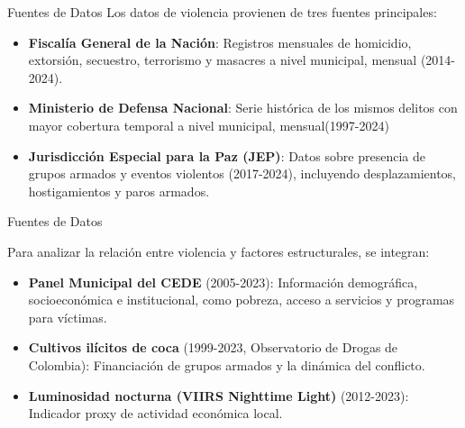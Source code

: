 
\begin{frame}{Fuentes de Datos}
Los datos de violencia provienen de tres fuentes principales:

\begin{itemize}
    \item \textbf{Fiscalía General de la Nación}: Registros mensuales de \alert{homicidio, extorsión, secuestro, terrorismo y masacres} a nivel municipal, mensual (2014-2024).
    \item \textbf{Ministerio de Defensa Nacional}: Serie histórica de los mismos delitos con \alert{mayor cobertura temporal} a nivel municipal, mensual(1997-2024)%
    \item \textbf{Jurisdicción Especial para la Paz (JEP)}: Datos sobre \alert{presencia de grupos armados y eventos violentos} (2017-2024), incluyendo desplazamientos, hostigamientos y paros armados.
\end{itemize}
\end{frame}
\begin{frame}{Fuentes de Datos}

Para analizar la relación entre violencia y factores estructurales, se integran:

\begin{itemize}
    \item \textbf{Panel Municipal del CEDE} (2005-2023): Información demográfica, socioeconómica e institucional, como \alert{pobreza, acceso a servicios y programas para víctimas}.
    \item \textbf{Cultivos ilícitos de coca} (1999-2023, Observatorio de Drogas de Colombia): Financiación de grupos armados y la \alert{dinámica del conflicto}.
    \item \textbf{Luminosidad nocturna (VIIRS Nighttime Light)} (2012-2023): Indicador proxy de \alert{actividad económica local}.
\end{itemize}
\end{frame}